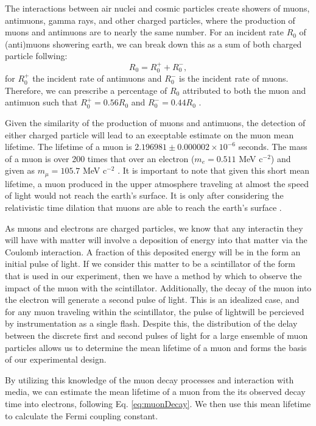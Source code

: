 \documentclass[
    aps, 
    twocolumn, 
    secnumarabic, 
    balancelastpage, 
    amsmath, 
    amssymb, 
    nofootinbib, 
    floatfix
]{revtex4-2}
\begin{document}
The interactions between air nuclei and cosmic particles create showers of muons, antimuons, gamma rays, and other charged particles, where the production of muons and antimuons are to nearly the same number. For an incident rate $R_0$ of (anti)muons showering earth, we can break down this as a sum of both charged particle follwing:
\begin{equation}
	R_0 = R_0^+ + R_0^-,
	\label{eq:coeffs}
\end{equation}
for $R_0^+$ the incident rate of antimuons and $R_0^-$ is the incident rate of muons. Therefore, we can prescribe a percentage of $R_0$ attributed to both the muon and antimuon such that $R_0^+ = 0.56R_0$ and $R_0^- = 0.44R_0$ \cite{galbiati2005}. \par 

Given the similarity of the production of muons and antimuons, the detection of either charged particle will lead to an execptable estimate on the muon mean lifetime. The lifetime of a muon is $2.196981 \pm 0.000002 \times 10^{-6}$ seconds. The mass of a muon is over 200 times that over an electron ($m_e = 0.511$ MeV c$^{-2}$) and given as $m_\mu = 105.7$ MeV c$^{-2}$ \cite{olive2014, manual2021}. It is important to note that given this short mean lifetime, a muon produced in the upper atmosphere traveling at almost the speed of light would not reach the earth's surface. It is only after considering the relativistic time dilation that muons are able to reach the earth's surface \cite{manual2021}. \par  

As muons and electrons are charged particles, we know that any interactin they will have with matter will involve a deposition of energy into that matter via the Coulomb interaction. A fraction of this deposited energy will be in the form an initial pulse of light. If we consider this matter to be a scintillator of the form that is used in our experiment, then we have a method by which to observe the impact of the muon with the scintillator. Additionally, the decay of the muon into the electron will generate a second pulse of light. This is an idealized case, and for any muon traveling within the scintillator, the pulse of lightwill be percieved by instrumentation as a single flash. Despite this, the distribution of the delay between the discrete first and second pulses of light for a large ensemble of muon particles allows us to determine the mean lifetime of a muon and forms the basis of our experimental design.

By utilizing this knowledge of the muon decay processes and interaction with media, we can estimate the mean lifetime of a muon from the its observed decay time into electrons, following Eq. \eqref{eq:muonDecay}. We then use this mean lifetime to calculate the Fermi coupling constant. 
\end{document}

